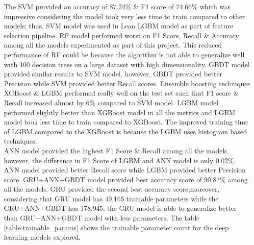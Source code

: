 \documentclass[twoside,11pt,a4paper]{article}
\begin{document}
The \acs{SVM} provided an accuracy of 87.24\% \& F1 score of 74.66\% which was impressive considering the model took very less time to train compared to other models; thus, \acs{SVM} model was used in Lean \acs{LGBM} model as part of feature selection pipeline. \acs{RF} model performed worst on F1 Score, Recall \& Accuracy among all the models experimented as part of this project. This reduced performance of \acs{RF} could be because the algorithm is not able to generalize well with 100 decision trees on a large dataset with high dimensionality. \acs{GBDT} model provided similar results to \acs{SVM} model, however, \acs{GBDT} provided better Precision while \acs{SVM} provided better Recall scores. Ensemble boosting techniques \acs{XGBoost} \& \acs{LGBM} performed really well on the test set such that F1 score \& Recall increased almost by  6\% compared to \acs{SVM} model. \acs{LGBM} model performed slightly better than \acs{XGBoost} model in all the metrics and \acs{LGBM} model took less time to train compared to \acs{XGBoost}. The improved training time of \acs{LGBM} compared to the \acs{XGBoost} is because the \acs{LGBM} uses histogram based techniques.\\

\acs{ANN} model provided the highest F1 Score \& Recall among all the models, however, the difference in F1 Score of \acs{LGBM} and \acs{ANN} model is only 0.02\%. \acs{ANN}  model provided better Recall score while \acs{LGBM} provided better Precision score. \acs{GRU}+\acs{ANN}+\acs{GBDT} model provided best accuracy score of 90.87\% among all the models. \acs{GRU} provided the second best accuracy score;moreover, considering that \acs{GRU} model has 49,165 trainable parameters while the \acs{GRU}+\acs{ANN}+\acs{GBDT} has 178,945, the \acs{GRU} model is able to generalize better than \acs{GRU}+\acs{ANN}+\acs{GBDT} model with less parameters. The table \ref{table:trainable_params} shows the trainable parameter count for the deep learning models explored.
\end{document}
